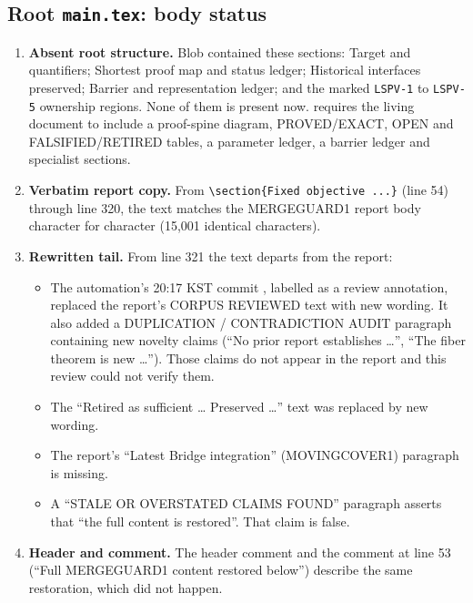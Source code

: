 \documentclass[11pt]{article}
\begin{document}
\subsection{Root \texttt{main.tex}: body status}
\begin{enumerate}
\item \textbf{Absent root structure.} Blob  contained these
sections: Target and quantifiers; Shortest proof map and status ledger;
Historical interfaces preserved; Barrier and representation ledger; and
the marked \texttt{LSPV-1} to \texttt{LSPV-5} ownership regions. None of
them is present now.  requires the living document to
include a proof-spine diagram, PROVED/EXACT, OPEN and FALSIFIED/RETIRED
tables, a parameter ledger, a barrier ledger and specialist sections.
\item \textbf{Verbatim report copy.} From \verb|\section{Fixed objective ...}|
(line 54) through line 320, the text matches the MERGEGUARD1 report body
character for character (15{,}001 identical characters).
\item \textbf{Rewritten tail.} From line 321 the text departs from the
report:
\begin{itemize}
\item The automation's 20:17 KST commit , labelled as a
review annotation, replaced the report's CORPUS REVIEWED text with new
wording. It also added a DUPLICATION / CONTRADICTION AUDIT paragraph
containing new novelty claims (``No prior report establishes \ldots'',
``The fiber theorem is new \ldots''). Those claims do not appear in the
report and this review could not verify them.
\item The ``Retired as sufficient \ldots{} Preserved \ldots'' text was
replaced by new wording.
\item The report's ``Latest Bridge integration'' (MOVINGCOVER1) paragraph
is missing.
\item A ``STALE OR OVERSTATED CLAIMS FOUND'' paragraph asserts that ``the
full content is restored''. That claim is false.
\end{itemize}
\item \textbf{Header and comment.} The header comment and the comment at
line 53 (``Full MERGEGUARD1 content restored below'') describe the same
restoration, which did not happen.
\end{enumerate}
\end{document}
